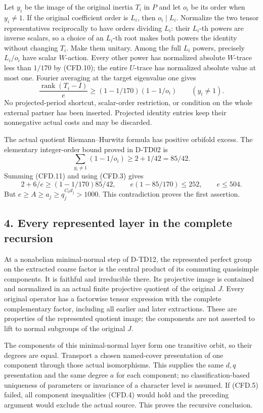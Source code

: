 Let $y_i$ be the image of the original inertia $T_i$ in $P$ and
let $o_i$ be its order when $y_i\ne1$. If the original coefficient
order is $L_i$, then $o_i\mid L_i$. Normalize the two tensor
representatives reciprocally to have orders dividing $L_i$: their
$L_i$-th powers are inverse scalars, so a choice of an $L_i$-th root
makes both powers the identity without changing $T_i$. Make them
unitary. Among the full $L_i$ powers, precisely $L_i/o_i$ have
scalar $W$-action. Every other power has normalized absolute
$W$-trace less than $1/170$ by (CFD.10); the entire $U$-trace
has normalized absolute value at most one. Fourier averaging at
the target eigenvalue one gives
\[
 \frac{\operatorname{rank}(T_i-I)}e
       \ge(1-1/170)(1-1/o_i)\qquad(y_i\ne1).
 \tag{CFD.11}
\]
No projected-period shortcut, scalar-order restriction, or condition
on the whole external partner has been inserted. Projected identity
entries keep their nonnegative actual costs and may be discarded.

The actual quotient Riemann--Hurwitz formula has positive orbifold
excess. The elementary integer-order bound proved in D-TD02 is
\[
             \sum_{y_i\ne1}(1-1/o_i)\ge2+1/42=85/42.
 \tag{CFD.12}
\]
Summing (CFD.11) and using (CFD.3) gives
\[
          2+6/e\ge(1-1/170)85/42,
          \qquad e(1-85/170)\le252,
          \qquad e\le504.
 \tag{CFD.13}
\]
But $e\ge A\ge a_j\ge q_j^{C_0d_j}>1000$. This contradiction
proves the first assertion.

\subsection*{4. Every represented layer in the complete recursion}

At a nonabelian minimal-normal step of D-TD12, the represented
perfect group on the extracted coarse factor is the central product
of its commuting quasisimple components. It is faithful and
irreducible there. Its projective image is contained and normalized
in an actual finite projective quotient of the original $J$.
Every original operator has a factorwise tensor expression with
the complete complementary factor, including all earlier and later
extractions. These are properties of the represented quotient
image; the components are not asserted to lift to normal subgroups
of the original $J$.

The components of this minimal-normal layer form one transitive
orbit, so their degrees are equal. Transport a chosen named-cover
presentation of one component through those actual isomorphisms.
This supplies the same $d,q$ presentation and the same degree $a$
for each component; no classification-based uniqueness of parameters
or invariance of a character level is assumed. If (CFD.5) failed,
all component inequalities (CFD.4) would hold and the preceding
argument would exclude the actual source. This proves the
recursive conclusion.

